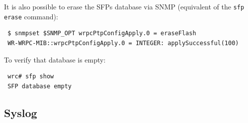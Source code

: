 \documentclass[a4paper, 12pt]{article}
\renewcommand{\_}{\underscore\allowbreak}
\begin{document}
It is also possible to erase the SFPs database via SNMP (equivalent of
the \texttt{sfp erase} command):
\begin{lstlisting}
 $ snmpset $SNMP_OPT wrpcPtpConfigApply.0 = eraseFlash
 WR-WRPC-MIB::wrpcPtpConfigApply.0 = INTEGER: applySuccessful(100)
\end{lstlisting}

To verify that database is empty:
\begin{lstlisting}
 wrc# sfp show
 SFP database empty
\end{lstlisting}

\newpage
\subsection{Syslog}
\label{Syslog}
\end{document}
